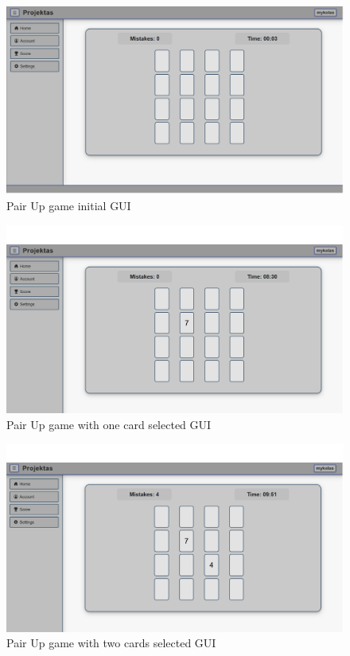 \documentclass[11pt,a4paper]{article}
\begin{document}
\begin{figure}[H]
    \centering
    \includegraphics[width=1\textwidth,keepaspectratio]{PSI_3rd_trial/PNGs/pair_up_1.png}
    \caption{Pair Up game initial GUI}
    \label{fig:pair_up_1}
\end{figure}

\begin{figure}[H]
    \centering
    \includegraphics[width=1\textwidth,keepaspectratio]{PSI_3rd_trial/PNGs/pair_up_2.png}
    \caption{Pair Up game with one card selected GUI}
    \label{fig:pair_up_2}
\end{figure}


\begin{figure}[H]
    \centering
    \includegraphics[width=1\textwidth,keepaspectratio]{PSI_3rd_trial/PNGs/pair_up_3.png}
    \caption{Pair Up game with two cards selected GUI}
    \label{fig:pair_up_3}
\end{figure}
\end{document}
